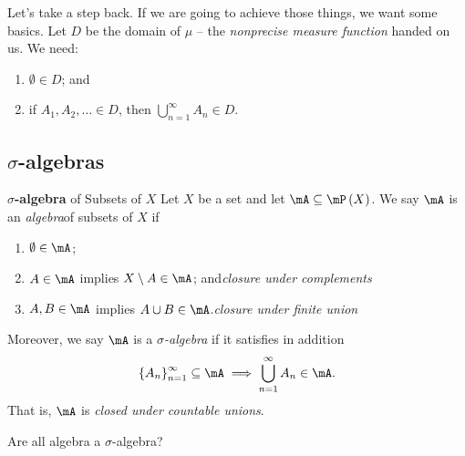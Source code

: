 \documentclass[pmath451]{subfiles}
\begin{document}
    \np Let's take a step back. If we are going to achieve those things, we want some basics. Let $D$ be the domain of $\mu$ -- the \textit{nonprecise measure function} handed on us. We need:
    \begin{enumerate}
        \item $\emptyset\in D$; and
        \item if $A_1,A_2,\ldots\in D$, then $\bigcup^{\infty}_{n=1} A_n\in D$.
    \end{enumerate}
    
    \subsection{$\sigma$-algebras}
    
    \begin{definition}{\textbf{$\sigma$-algebra} of Subsets of $X$}
        Let $X$ be a set and let $\mA\subseteq\mP\left( X \right)$. We say $\mA$ is an \emph{algebra}\footnotemark[1] of subsets of $X$ if
        \begin{enumerate}
            \item $\emptyset\in\mA$;
            \item $A\in\mA$ implies $X\setminus A\in\mA$; and\hfill\textit{closure under complements}
            \item $A,B\in\mA$ implies $A\cup B\in\mA$.\hfill\textit{closure under finite union}
        \end{enumerate}
        Moreover, we say $\mA$ is a \emph{$\sigma$-algebra} if it satisfies in addition
        \begin{equation*}
            \left\lbrace A_n \right\rbrace^{\infty}_{n=1} \subseteq\mA \implies \bigcup^{\infty}_{n=1} A_n\in\mA.
        \end{equation*}
        That is, $\mA$ is \textit{closed under countable unions}.
        
        \noindent
        \begin{minipage}{\textwidth}
        \end{minipage}
    \end{definition}
    
    \clearpage

    \begin{question}
        Are all algebra a $\sigma$-algebra?
    \end{question}
\end{document}
